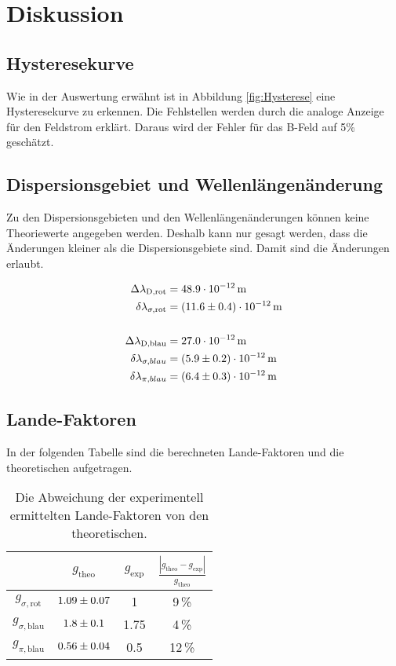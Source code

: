 \section{Diskussion}
\label{sec:Diskussion}
\subsection{Hysteresekurve}
Wie in der Auswertung erwähnt ist in Abbildung \eqref{fig:Hysterese} eine Hysteresekurve zu erkennen. Die Fehlstellen werden durch die analoge Anzeige für den Feldstrom erklärt. Daraus wird der Fehler für das B-Feld auf 5\% geschätzt.


\subsection{Dispersionsgebiet und Wellenlängenänderung}
Zu den Dispersionsgebieten und den Wellenlängenänderungen können keine Theoriewerte angegeben werden. Deshalb kann nur gesagt werden, dass die Änderungen kleiner als die Dispersionsgebiete sind. Damit sind die Änderungen erlaubt.

\begin{align*}
  \Delta\lambda_\text{D,rot} &= 48.9 \cdot 10^{-12}\,\text{m} \\
  \delta \lambda_{\sigma,\text{rot}} &= (\num{11.6 +- 0.4})\cdot 10^{-12}\,\text{m} \\
  \\
  \Delta\lambda_\text{D,blau} &= 27.0 \cdot 10^{-12}\,\text{m} \\
  \delta \lambda_{\sigma,blau} &= (\num{5.9 +- 0.2})\cdot 10^{-12}\,\text{m} \\
  \delta \lambda_{\pi,blau} &= (\num{6.4 +- 0.3})\cdot 10^{-12}\,\text{m}
\end{align*}


\subsection{Lande-Faktoren}
In der folgenden Tabelle sind die berechneten Lande-Faktoren und die theoretischen aufgetragen.

\begin{table}[H]
   \centering
   \caption{Die Abweichung der experimentell ermittelten Lande-Faktoren von den theoretischen.}
   \label{tab:}
   \begin{tabular}{c|c|c|c}
     & $g_\text{theo}$ & $g_\text{exp}$ & $\frac{|g_\text{theo} - g_\text{exp}|}{g_\text{theo}}$ \\
     \hline
     $g_{\sigma,\text{rot}}$  & $\num{1.09 +- 0.07}$ & 1 & 9\,\% \\
     $g_{\sigma,\text{blau}}$ & $\num{1.8 +- 0.1}$   & 1.75 & 4\,\% \\
     $g_{\pi,\text{blau}}$    & $\num{0.56 +- 0.04}$ & 0.5 & 12\,\% \\
   \end{tabular}
\end{table}

